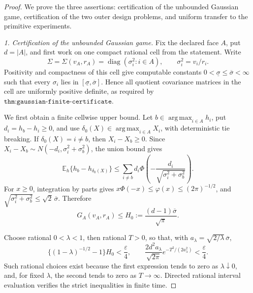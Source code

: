 \documentclass{article}
\begin{document}
\begin{proof}
We prove the three assertions: certification of the unbounded Gaussian game, certification of the two outer design problems, and uniform transfer to the primitive experiments.

\emph{1. Certification of the unbounded Gaussian game.}
Fix the declared face \(A\), put \(d=|A|\), and first work on one compact rational cell from the statement.  Write
\[
\Sigma=\Sigma(v_A,r_A)=\operatorname{diag}(\sigma_i^2:i\in A),
\qquad \sigma_i^2=v_i/r_i.
\]
Positivity and compactness of this cell give computable constants \(0<\underline\sigma\leq\overline\sigma<\infty\) such that every \(\sigma_i\) lies in \([\underline\sigma,\overline\sigma]\).  Hence all quotient covariance matrices in the cell are uniformly positive definite, as required by \(\texttt{thm:gaussian-finite-certificate}\).

We first obtain a finite cellwise upper bound.  Let \(b\in\operatorname*{arg\,max}_{i\in A}h_i\), put \(d_i=h_b-h_i\geq0\), and use \(\delta_0(X)\in\operatorname*{arg\,max}_{i\in A}X_i\), with deterministic tie breaking.  If \(\delta_0(X)=i\ne b\), then \(X_i-X_b\geq0\).  Since \(X_i-X_b\sim N(-d_i,\sigma_i^2+\sigma_b^2)\), the union bound gives
\[
\mathbb E_h\{h_b-h_{\delta_0(X)}\}
\leq\sum_{i\ne b}d_i\Phi\!\left(-\frac{d_i}{\sqrt{\sigma_i^2+\sigma_b^2}}\right).       \tag{1}
\]
For \(x\geq0\), integration by parts gives \(x\Phi(-x)\leq\varphi(x)\leq(2\pi)^{-1/2}\), and \(\sqrt{\sigma_i^2+\sigma_b^2}\leq\sqrt2\,\overline\sigma\).  Therefore
\[
G_A(v_A,r_A)\leq H_0:=\frac{(d-1)\overline\sigma}{\sqrt\pi}.       \tag{2}
\]

Choose rational \(0<\lambda<1\), then rational \(T>0\), so that, with \(a_\lambda=\sqrt{2/\lambda}\,\overline\sigma\),
\[
\{(1-\lambda)^{-1/2}-1\}H_0<\frac\varepsilon4,
\qquad
\frac{2d^2a_\lambda}{\sqrt{2\pi}}
e^{-T^2/(2a_\lambda^2)}<\frac\varepsilon4.                        \tag{3}
\]
Such rational choices exist because the first expression tends to zero as \(\lambda\downarrow0\), and, for fixed \(\lambda\), the second tends to zero as \(T\to\infty\).  Directed rational interval evaluation verifies the strict inequalities in finite time.


\end{proof}
\end{document}
